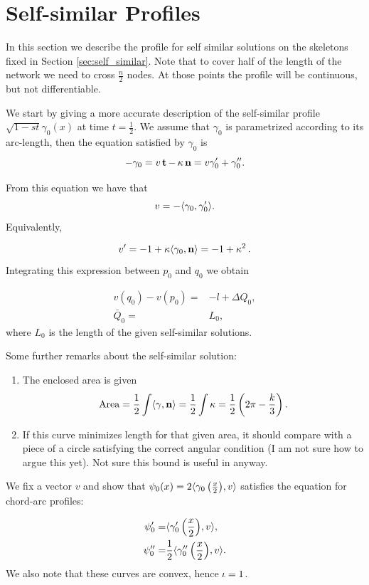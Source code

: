 \documentclass[12pt]{amsart}
\begin{document}
\section{Self-similar Profiles}

In this section we describe the profile for self similar solutions on the skeletons fixed in Section \ref{sec:self_similar}. Note that to cover half of the length of the network we need to cross $\frac{n}{2}$ nodes. At those points the profile will be continuous, but not differentiable.

We start by giving a more accurate description of the self-similar profile $\sqrt{1-st}\gamma_0(x)$ at time $t=\frac{1}{2}$. We assume that $\gamma_0$ is parametrized according to its arc-length, then the equation satisfied by $\gamma_0$ is
\begin{equation} -\gamma_0= v \operatorname{\mathbf{t}}- \operatorname{\kappa} \operatorname{\mathbf{n}}= v \gamma_0'+\gamma_0''.
\label{eq:self-similar curve}
\end{equation}

From this equation we have that
$$v=- \langle{\gamma_0},{\gamma_0'}\rangle.$$
Equivalently,

$$v'=-1+\operatorname{\kappa}\langle{\gamma_0},{\operatorname{\mathbf{n}}}\rangle =-1+\operatorname{\kappa}^2.$$
Integrating this expression between $p_0$ and $q_0$ we obtain

\begin{align*}
v(q_0)-v(p_0)=& - l+\Delta Q_0,\\
\bar{Q}_0=&L_0,
\end{align*}
where $L_0$ is the length of the given self-similar solutions.

Some further remarks about the self-similar solution:

\begin{enumerate}
\item The enclosed area is given
$$\operatorname{Area}=\frac{1}{2}\int \langle{\gamma},{\operatorname{\mathbf{n}}}\rangle=\frac{1}{2}\int \operatorname{\kappa}=\frac{1}{2}\left(2\pi-\frac{k}{3}\right).$$
\item If this curve minimizes length for that given area, it should compare with a piece of a circle satisfying the correct angular condition (I am not sure how to argue this yet). Not sure this bound is useful in anyway.
\end{enumerate}


We fix a vector $v$ and show that $\psi_0(x)=2\langle{\gamma_0\left(\frac{x}{2}\right)},{v}\rangle$ satisfies the equation for chord-arc profiles:

\begin{align*}
\psi_0'= &\langle{\gamma_0'\left(\frac{x}{2}\right)},{v}\rangle,\\
\psi_0''= &\frac{1}{2}\langle{\gamma_0''\left(\frac{x}{2}\right)},{v}\rangle.
\end{align*}
We also note that these curves are convex, hence $\operatorname{\iota}=1$.
\end{document}
